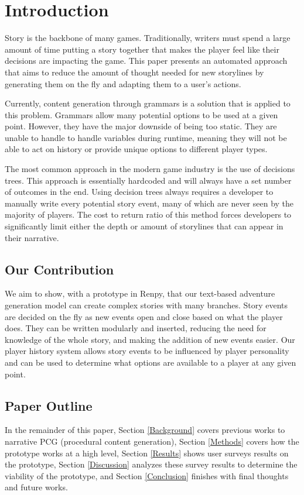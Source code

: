 \section{Introduction} \label{Introduction}
Story is the backbone of many games. Traditionally, writers must spend a large amount of time putting a story together that makes the player feel like their decisions are impacting the game. This paper presents an automated approach that aims to reduce the amount of thought needed for new storylines by generating them on the fly and adapting them to a user's actions.

Currently, content generation through grammars is a solution that is applied to this problem. Grammars allow many potential options to be used at a given point. However, they have the major downside of being too static. They are unable to handle to handle variables during runtime, meaning they will not be able to act on history or provide unique options to different player types.

The most common approach in the modern game industry is the use of decisions trees. This approach is essentially hardcoded and will always have a set number of outcomes in the end. Using decision trees always requires a developer to manually write every potential story event, many of which are never seen by the majority of players. The cost to return ratio of this method forces developers to significantly limit either the depth or amount of storylines that can appear in their narrative.

\subsection{Our Contribution}
We aim to show, with a prototype in Renpy, that our text-based adventure generation model can create complex stories with many branches. Story events are decided on the fly as new events open and close based on what the player does. They can be written modularly and inserted, reducing the need for knowledge of the whole story, and making the addition of new events easier. Our player history system allows story events to be influenced by player personality and can be used to determine what options are available to a player at any given point.

\subsection{Paper Outline}
In the remainder of this paper, Section \ref{Background} covers previous works to narrative PCG (procedural content generation), Section \ref{Methods} covers how the prototype works at a high level, Section \ref{Results} shows user surveys results on the prototype, Section \ref{Discussion} analyzes these survey results to determine the viability of the prototype, and Section \ref{Conclusion} finishes with final thoughts and future works.

